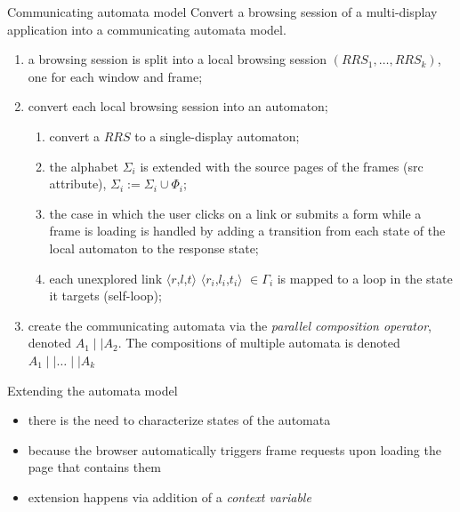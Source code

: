 \documentclass[usenames,dvipsnames]{beamer}
\newcommand{\reqmulti}[1][]{
  \ifthenelse{\equal{#1}{}} {\mbox{$\langle r$,$l$,$t\rangle$}}
  {\mbox{$\langle r_{#1}$,$l_{#1}$,$t_{#1}\rangle$}}
}
\theoremstyle{definition}
\begin{document}
\begin{frame}{Communicating automata model}
  Convert a browsing session of a multi-display application into a communicating automata model.

  \begin{enumerate}
    \item a browsing session is split into a local browsing session $(RRS_1,\dots,RRS_k)$, one for each window and frame;
    \item convert each local browsing session into an automaton;
      \begin{enumerate}
        \item convert a $RRS$ to a single-display automaton;
        \item the alphabet $\Sigma_i$ is extended with the source pages of the frames (src attribute), $\Sigma_i := \Sigma_i\cup\Phi_i$;
        \item the case in which the user clicks on a link or submits a form while a frame is loading is handled by adding a transition from each state of the local automaton to the response state;
        \item each unexplored link \reqmulti[i]$\in\Gamma_i$ is mapped to a loop in the state it targets (self-loop);
      \end{enumerate}
    \item create the communicating automata via the \textit{parallel composition operator}, denoted $A_1\mid\mid A_2$. The compositions of multiple automata is denoted $A_1\mid\mid\dots\mid\mid A_k$
  \end{enumerate}
\end{frame}

\begin{frame}{Extending the automata model}
  \begin{itemize}
    \item there is the need to characterize states of the automata
    \item because the browser automatically triggers frame requests upon loading the page that contains them
    \item extension happens via addition of a \textit{context variable}
  \end{itemize}
\end{frame}
\end{document}
